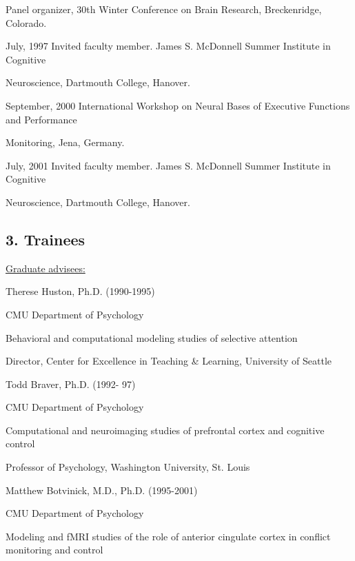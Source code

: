 \documentclass[10 pt]{article}
\begin{document}
\hspace{1.1in} Panel organizer, 30th Winter Conference on Brain Research, Breckenridge, Colorado.

July, 1997 \hspace{0.44in} Invited faculty member. James S. McDonnell Summer Institute in Cognitive

\hspace{1.1in} Neuroscience, Dartmouth College, Hanover.

September, 2000 \hspace{0.05in} International Workshop on Neural Bases of Executive Functions and Performance

\hspace{1.1in} Monitoring, Jena, Germany.

July, 2001 \hspace{0.44in} Invited faculty member. James S. McDonnell Summer Institute in Cognitive

\hspace{1.1in} Neuroscience, Dartmouth College, Hanover.
    \smallskip

\subsection*{3. Trainees} \label{secTEACHING3}
    \smallskip

{\fontsize{12pt}{16 pt}\selectfont \underline{Graduate advisees:}}
    \smallskip

Therese Huston, Ph.D. (1990-1995)

CMU Department of Psychology

Behavioral and computational modeling studies of selective attention

Director, Center for Excellence in Teaching \& Learning, University of Seattle
    \medskip

Todd Braver, Ph.D. (1992- 97)

CMU Department of Psychology

Computational and neuroimaging studies of prefrontal cortex and cognitive control

Professor of Psychology, Washington University, St. Louis
    \medskip

Matthew Botvinick, M.D., Ph.D. (1995-2001)

CMU Department of Psychology

Modeling and fMRI studies of the role of anterior cingulate cortex in conflict monitoring and control
\end{document}
